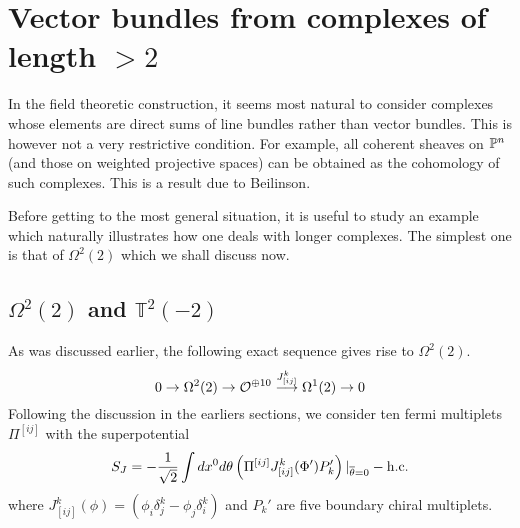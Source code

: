 \documentclass[a4paper,12pt]{article}
\def\Bbb{\mathbb}
\def\BT{\Bbb T}
\begin{document}
\section{Vector bundles from complexes of length $>2$}
\label{seclong}

In the field theoretic construction, it seems most natural to consider
complexes whose elements are direct sums of line bundles rather than
vector bundles. This is however not a very restrictive condition.
For example, all coherent sheaves on $\BP^n$ (and those on
weighted projective spaces)
can be obtained as the cohomology of such complexes. This is a result due
to Beilinson. 


Before getting to the most general situation, it is useful to study an
example which naturally illustrates how one deals with longer complexes.
The simplest one is that of $\Omega^2(2)$ which we shall discuss now.
\subsection{$\Omega^2(2)$ and $\BT^2(-2)$}
As was discussed earlier, the following exact sequence gives rise
to $\Omega^2(2)$.
\begin{equation}
0\rightarrow \Omega^{2}(2)
\rightarrow {\cal O}^{\oplus 10}\stackrel{J_{[ij]}^k}{\longrightarrow}
\Omega^{1}(2)\rightarrow 0
\end{equation}
Following the discussion in the earliers sections,
we consider ten fermi multiplets $\Pi^{[ij]}$ with the
superpotential
\begin{equation}
S_J=-{1\over\sqrt2} \int dx^0 d\theta \left(\Pi^{[ij]}
J_{[ij]}^k(\Phi')P_k'\right)|_{\overline{\theta}=0} -
{\rm h.c.}
\end{equation}
where $J_{[ij]}^k(\phi) = (\phi_i \delta_j^k - \phi_j \delta_i^k)$ and
$P_k'$ are five boundary chiral multiplets. 
\end{document}
